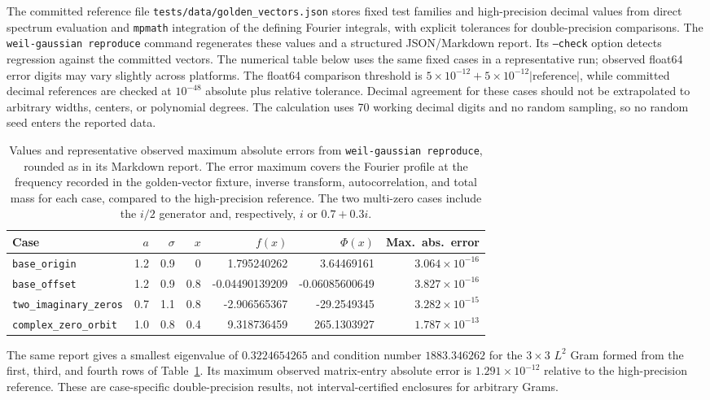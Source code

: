 \documentclass[11pt]{article}
\begin{document}
The committed reference file
\texttt{tests/data/golden\_vectors.json} stores fixed test families and
high-precision decimal values from direct spectrum evaluation and
\texttt{mpmath} integration of the defining Fourier integrals,
with explicit tolerances for double-precision comparisons. The
\texttt{weil-gaussian reproduce} command regenerates these values and a
structured JSON/Markdown report. Its \texttt{--check} option detects
regression against the committed vectors. The numerical table below
uses the same fixed cases in a representative run; observed float64 error
digits may vary slightly across platforms. The float64 comparison threshold
is $5\times10^{-12}+5\times10^{-12}|\text{reference}|$, while committed
decimal references are checked at $10^{-48}$ absolute plus relative
tolerance. Decimal agreement for these cases should not
be extrapolated to arbitrary widths, centers, or polynomial degrees.
The calculation uses 70 working decimal digits and no random sampling,
so no random seed enters the reported data.

\clearpage
\begin{table}[htbp]
\centering
\footnotesize
\begin{tabular}{lrrrrrr}
\hline
Case & $a$ & $\sigma$ & $x$ & $f(x)$ & $\Phi(x)$ & Max.\ abs.\ error\\
\hline
\texttt{base\_origin}          & 1.2 & 0.9 & 0   &  1.795240262 &   3.64469161  & $3.064\times10^{-16}$\\
\texttt{base\_offset}          & 1.2 & 0.9 & 0.8 & -0.04490139209 & -0.06085600649 & $3.827\times10^{-16}$\\
\texttt{two\_imaginary\_zeros} & 0.7 & 1.1 & 0.8 & -2.906565367 & -29.2549345   & $3.282\times10^{-15}$\\
\texttt{complex\_zero\_orbit}  & 1.0 & 0.8 & 0.4 &  9.318736459 & 265.1303927   & $1.787\times10^{-13}$\\
\hline
\end{tabular}
\caption{Values and representative observed maximum absolute errors from
\texttt{weil-gaussian reproduce}, rounded as in its Markdown report.
The error maximum covers the Fourier profile at the frequency recorded
in the golden-vector fixture, inverse transform, autocorrelation,
and total mass for each case, compared to the
high-precision reference. The two multi-zero cases include the
$i/2$ generator and, respectively, $i$ or $0.7+0.3i$.}
\label{tab:golden}
\end{table}

The same report gives a smallest eigenvalue of $0.3224654265$ and
condition number $1883.346262$ for the $3\times3$ $L^2$ Gram formed
from the first, third, and fourth rows of Table~\ref{tab:golden}. Its
maximum observed matrix-entry absolute error is
$1.291\times10^{-12}$ relative to the high-precision reference.
These are case-specific double-precision results, not
interval-certified enclosures for arbitrary Grams.
\end{document}
